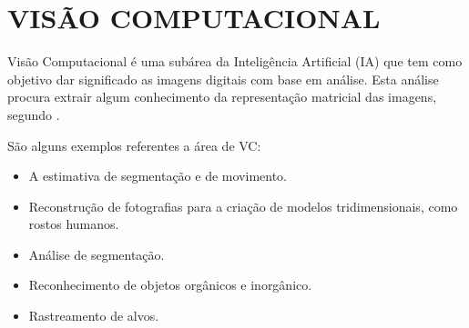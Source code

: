 % 
% 

\section{VISÃO COMPUTACIONAL}\label{Sub:vc}

Visão Computacional é uma subárea da Inteligência Artificial (IA) que tem como objetivo dar significado as imagens digitais com base em análise. Esta análise procura extrair algum conhecimento da representação matricial das imagens, segundo . 

São alguns exemplos referentes a área de VC: 
\begin{itemize}
\item A estimativa de segmentação e de movimento.
\item Reconstrução de fotografias para a criação de modelos tridimensionais, como rostos humanos.
\item Análise de segmentação.
\item Reconhecimento de objetos orgânicos e inorgânico.
\item Rastreamento de alvos.
\end{itemize}

